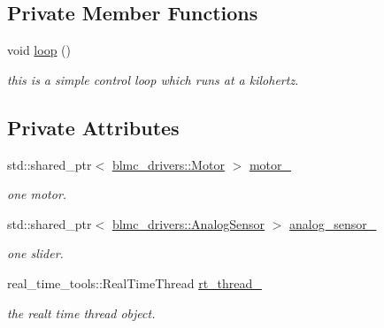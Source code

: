 \subsection*{Private Member Functions}
\begin{DoxyCompactItemize}
\item 
void \hyperlink{classController_a9ec8c2d4a68acccd118537c36894e516}{loop} ()
\begin{DoxyCompactList}\small\item\em this is a simple control loop which runs at a kilohertz. \end{DoxyCompactList}\end{DoxyCompactItemize}
\subsection*{Private Attributes}
\begin{DoxyCompactItemize}
\item 
std\+::shared\+\_\+ptr$<$ \hyperlink{classblmc__drivers_1_1Motor}{blmc\+\_\+drivers\+::\+Motor} $>$ \hyperlink{classController_abad7e0e003f885504b2de5e929afd187}{motor\+\_\+}\hypertarget{classController_abad7e0e003f885504b2de5e929afd187}{}\label{classController_abad7e0e003f885504b2de5e929afd187}

\begin{DoxyCompactList}\small\item\em one motor. \end{DoxyCompactList}\item 
std\+::shared\+\_\+ptr$<$ \hyperlink{classblmc__drivers_1_1AnalogSensor}{blmc\+\_\+drivers\+::\+Analog\+Sensor} $>$ \hyperlink{classController_a33ba57988a9da049562e61572ae53a05}{analog\+\_\+sensor\+\_\+}\hypertarget{classController_a33ba57988a9da049562e61572ae53a05}{}\label{classController_a33ba57988a9da049562e61572ae53a05}

\begin{DoxyCompactList}\small\item\em one slider. \end{DoxyCompactList}\item 
real\+\_\+time\+\_\+tools\+::\+Real\+Time\+Thread \hyperlink{classController_abef4676ee65620e3e61fd2fb6107c00e}{rt\+\_\+thread\+\_\+}\hypertarget{classController_abef4676ee65620e3e61fd2fb6107c00e}{}\label{classController_abef4676ee65620e3e61fd2fb6107c00e}

\begin{DoxyCompactList}\small\item\em the realt time thread object. \end{DoxyCompactList}\end{DoxyCompactItemize}


